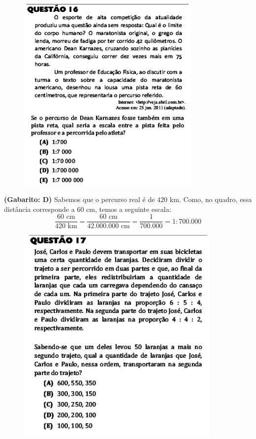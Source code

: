 \documentclass[a4paper]{article}
\begin{document}
\begin{figure}[H]
	\begin{center}
		\includegraphics[width=9cm]{L2Q16.png}
	\end{center}
\end{figure}
\par\textbf{(Gabarito: D)} Sabemos que o percurso real é de $420$ km. Como, no quadro, essa distância corresponde a $60$ cm, temos a seguinte escala:
\begin{equation*}
\frac{60\text{ cm}}{420\text{ km}} = \frac{60\text{ cm}}{42.000.000\text{ cm}} = \frac{1}{700.000} = 1:700.000
\end{equation*}
\begin{figure}[H]
	\begin{center}
		\includegraphics[width=10cm]{L2Q17.png}
	\end{center}
\end{figure}
\end{document}
